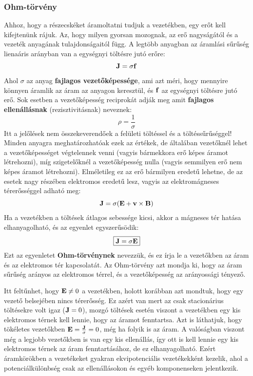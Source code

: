 \documentclass[a4paper,12pt]{article}
\begin{document}
\subsubsection{Ohm-törvény}
Ahhoz, hogy a részecskéket áramoltatni tudjuk a vezetékben, egy erőt kell kifejtenünk rájuk. Az, hogy milyen gyorsan mozognak, az erő nagyságától és a vezeték anyagának tulajdonságaitól függ.
A legtöbb anyagban az áramlási sűrűség lienaáris arányban van a egységnyi töltésre jutó erőre:
\begin{equation}
    \bold{J} = \sigma \bold{f}
\end{equation}
Ahol $\sigma$ az anyag \textbf{fajlagos vezetőképessége}, ami azt méri, hogy mennyire könnyen áramlik az áram az anyagon keresztül, és $\bold{f}$ az egységnyi töltésre jutó erő.
Sok esetben a vezetőképesség reciprokát adják meg amit \textbf{fajlagos ellenállásnak} (rezisztivitásnak) neveznek:
\begin{equation}
    \rho = \frac{1}{\sigma}
\end{equation}
Itt a jelőlések nem összekeverendőek a felületi töltéssel és a töltéssűrűséggel! Minden anyagra meghatározhatóak ezek az értékek, de általában vezetőknél lehet a vezetőképességet végtelennek venni (vagyis bármekkora erő képes áramot létrehozni), míg szigetelőknél a vezetőképesség nulla (vagyis semmilyen erő nem képes áramot létrehozni).
Elméletileg ez az erő bármilyen eredetű lehetne, de az esetek nagy részében elektromos eredetű lesz, vagyis az elektromágneses térerősséggel adható meg:
\begin{equation}
    \bold{J} = \sigma (\bold{E} + \bold{v} \times \bold{B})
\end{equation}
Ha a vezetékben a töltések átlagos sebessége kicsi, akkor a mágneses tér hatása elhanyagolható, és az egyenlet egyszerűsödik:
\begin{equation}
    \boxed{\bold{J} = \sigma \bold{E}}
\end{equation}
Ezt az egyenletet \textbf{Ohm-törvénynek} nevezzük, és ez írja le a vezetőkben az áram és az elektromos tér kapcsolatát. Az Ohm-törvény azt mondja ki, hogy az áram sűrűség arányos az elektromos térrel, és a vezetőképesség az arányossági tényező.

Itt feltűnhet, hogy $\bold{E} \neq 0$ a vezetékben, holott korábban azt mondtuk, hogy egy vezető belsejében nincs térerősség. Ez azért van mert az csak stacionárius töltésekre volt igaz ($\bold{J} = 0$), mozgó töltések esetén viszont a vezetékben egy kis elektromos térnek kell lennie, hogy az áramot fenntartsa.
Azt is láthatjuk, hogy tökéletes vezetőkben $\bold{E} = \frac{\bold{J}}{\sigma} = 0$, még ha folyik is az áram. A valóságban viszont még a legjobb vezetőkben is van egy kis ellenállás, így ott is kell lennie egy kis elektromos térnek az áram fenntartásához, de ez elhanyagolható.
Ezért áramkörökben a vezetékeket gyakran ekvipotenciális vezetékekként kezelik, ahol a potenciálkülönbség csak az ellenállásokon és egyéb komponenseken jelentkezik.
\end{document}
